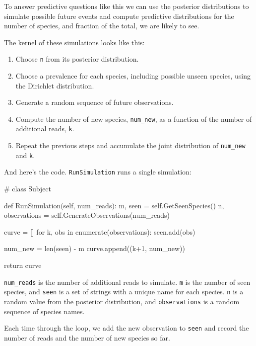 \documentclass[12pt]{book}
\theoremstyle{exercise}
\begin{document}
To answer predictive questions like this we can use the posterior
distributions to simulate possible future events and compute
predictive distributions for the number of species, and fraction of
the total, we are likely to see.

The kernel of these simulations looks like this:

\begin{enumerate}

\item Choose {\tt n} from its posterior distribution.

\item Choose a prevalence for each species, including possible unseen
  species, using the Dirichlet distribution.

\item Generate a random sequence of future observations.

\item Compute the number of new species, \verb"num_new", as a function
  of the number of additional reads, {\tt k}.

\item Repeat the previous steps and accumulate the joint distribution
  of \verb"num_new" and {\tt k}.

\end{enumerate}

And here's the code.  {\tt RunSimulation} runs a single simulation:

\begin{code}
# class Subject

    def RunSimulation(self, num_reads):
        m, seen = self.GetSeenSpecies()
        n, observations = self.GenerateObservations(num_reads)

        curve = []
        for k, obs in enumerate(observations):
            seen.add(obs)

            num_new = len(seen) - m
            curve.append((k+1, num_new))

        return curve
\end{code}

\verb"num_reads" is the number of additional reads to simulate.
{\tt m} is the number of seen species, and {\tt seen} is a set of
strings with a unique name for each species.
{\tt n} is a random value from the posterior distribution, and
{\tt observations} is a random sequence of species names.

Each time through the loop, we add the new observation to
{\tt seen} and record the number of reads and the number of
new species so far.
\end{document}
